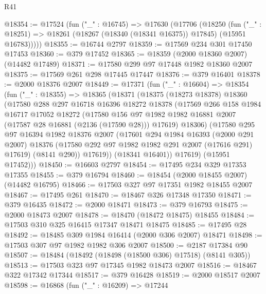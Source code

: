 \begin{lexlean}{R41}
\begin{coremodule}
@18354 := @17524
    (fun ("_" : @16745) =>
    @17630
      (@17706
        (@18250
          (fun ("_" : @18251) => @18261 (@18267 (@18340 (@18341 @16375)) @17845) (@15951 @16783)))))
@18355 := @16744 @2797
@18359 := @17569 @234 @301 @17450 @17453
@18360 := @379 @17452
@18365 := @18359 (@2000 @18360 @2007) (@14482 @17489)
@18371 := @17580 @299 @97 @17448 @1982 @18360 @2007
@18375 := @17569 @261 @298 @17445 @17447
@18376 := @379 @16401
@18378 := @2000 @18376 @2007
@18449 := @17371
    (fun ("_" : @16604) =>
    @18354
      (fun ("_" : @18355) =>
      @18365
        (@18371
          (@18375
            (@18273 @18378)
            @18360
            (@17580
              @288
              @297
              @16718
              @16396
              @18272
              @18378
              (@17569
                @266
                @158
                @1984
                @16717
                @17052
                @18272
                (@17580
                  @156
                  @97
                  @1982
                  @1982
                  @16881
                  @2007
                  (@17587 @28 @16881 (@2136 (@17590 @28)))
                  @17619)
                @18306)
              (@17580
                @295
                @97
                @16394
                @1982
                @18376
                @2007
                (@17601
                  @294
                  @1984
                  @16393
                  (@2000 @291 @2007)
                  @18376
                  (@17580 @292 @97 @1982 @1982 @291 @2007 (@17616 @291) @17619)
                  (@8141 @290))
                @17619))
            (@18341 @16401))
          @17619)
        (@15951 @17452)))
@18450 := @16603 @2797
@18454 := @17495 @234 @329 @17353 @17355
@18455 := @379 @16794
@18460 := @18454 (@2000 @18455 @2007) (@14482 @16795)
@18466 := @17503 @327 @97 @17351 @1982 @18455 @2007
@18467 := @17495 @261
@18470 := @18467 @326 @17348 @17350
@18471 := @379 @16435
@18472 := @2000 @18471
@18473 := @379 @16793
@18475 := @2000 @18473 @2007
@18478 := @18470 (@18472 @18475) @18455
@18484 := @17503 @310 @325 @16415 @17347 @18471 @18475
@18485 := @17495 @28
@18492 := @18485 @309 @1984 @16414 (@2000 @306 @2007) @18471
@18498 := @17503 @307 @97 @1982 @1982 @306 @2007
@18500 := @2187 @17384 @90
@18507 := @18484 (@18492 (@18498 (@18500 @306) @17518) (@8141 @305))
@18513 := @17503 @323 @97 @17345 @1982 @18473 @2007
@18516 := @18467 @322 @17342 @17344
@18517 := @379 @16428
@18519 := @2000 @18517 @2007
@18598 := @16868
    (fun ("_" : @16209) =>
    @17244

\end{coremodule}
\end{lexlean}
